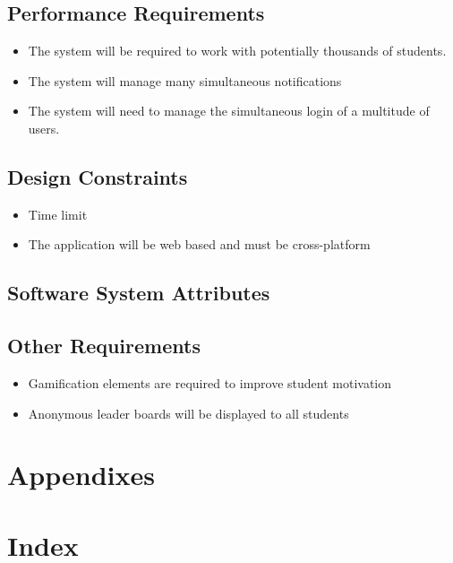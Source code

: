 \documentclass[a4paper,12pt]{article}
\begin{document}
        \subsection{Performance Requirements}
        \begin{itemize}
        \item The system will be required to work with potentially thousands of students.
        \item The system will manage many simultaneous notifications
        \item The system will need to manage the simultaneous login of a multitude of users.
        \end{itemize}
        
        \subsection{Design Constraints}
        \begin{itemize}
        \item Time limit
        \item The application will be web based and must be cross-platform
        \end{itemize}
        
        \subsection{Software System Attributes}
        
        \subsection{Other Requirements}
        \begin{itemize}
        \item Gamification elements are required to improve student motivation
        \item Anonymous leader boards will be displayed to all students
        \end{itemize}
    \section{Appendixes}
    
    \section{Index}
    
    \pagebreak  
\end{document}
